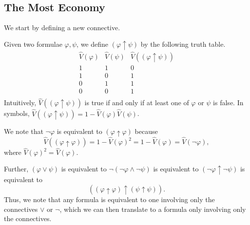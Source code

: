 \subsection{The Most Economy}
We start by defining a new connective.
\begin{definition}
	Given two formulae $\varphi,\psi$, we define $(\varphi\uparrow\psi)$ by the following truth table.
	\[\begin{array}{c|c||c}
		\hat V(\varphi) & \hat V(\psi) & \hat V((\varphi\uparrow\psi)) \\
		\hline
		1 & 1 & 0 \\
		1 & 0 & 1 \\
		0 & 1 & 1 \\
		0 & 0 & 1 \\
	\end{array}\]
	Intuitively, $\hat V((\varphi\uparrow\psi))$ is true if and only if at least one of $\varphi$ or $\psi$ is false. In symbols, $\hat V((\varphi\uparrow\psi))=1-\hat V(\varphi)\hat V(\psi)$.
\end{definition}
We note that $\lnot\varphi$ is equivalent to $(\varphi\uparrow\varphi)$ because
\[\hat V((\varphi\uparrow\varphi))=1-\hat V(\varphi)^2=1-\hat V(\varphi)=\hat V(\lnot\varphi),\]
where $\hat V(\varphi)^2=\hat V(\varphi)$.

Further, $(\varphi\lor\psi)$ is equivalent to $\lnot(\lnot\varphi\land\lnot\psi)$ is equivalent to $(\lnot\varphi\uparrow\lnot\psi)$ is equivalent to
\[((\varphi\uparrow\varphi)\uparrow(\psi\uparrow\psi)).\]
Thus, we note that any formula is equivalent to one involving only the connectives $\lor$ or $\lnot$, which we can then translate to a formula only involving only the connectives.

